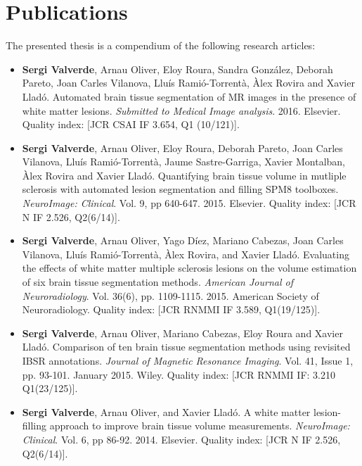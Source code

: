 
\chapter*{Publications}


The presented thesis is a compendium of the following research articles:

\begin{itemize}

\item  \textbf{Sergi Valverde}, Arnau Oliver, Eloy Roura, Sandra Gonz\'{a}lez, Deborah Pareto, Joan Carles Vilanova, Llu\'{i}s Rami\'{o}-Torrent\`{a}, \`{A}lex Rovira and Xavier Llad\'{o}.  Automated brain tissue segmentation of MR images in the presence of white matter lesions. \textit{Submitted to Medical Image analysis}. 2016. Elsevier.  Quality index:  [JCR CSAI IF 3.654, Q1 (10/121)].

\item \textbf{Sergi Valverde}, Arnau Oliver, Eloy Roura, Deborah Pareto, Joan Carles Vilanova, Llu\'{i}s Rami\'{o}-Torrent\`{a}, Jaume Sastre-Garriga, Xavier Montalban, \`{A}lex Rovira and Xavier Llad\'{o}. Quantifying brain tissue volume in mutliple sclerosis with automated lesion segmentation and filling SPM8 toolboxes. \textit{NeuroImage: Clinical}. Vol. 9, pp 640-647. 2015. Elsevier.  Quality index:  [JCR N IF 2.526, Q2(6/14)].

\item  \textbf{Sergi Valverde}, Arnau Oliver, Yago D\'{i}ez, Mariano Cabezas, Joan Carles Vilanova, Llu\'{i}s Rami\'{o}-Torrent\`{a}, \`{A}lex Rovira, and Xavier Llad\'o. Evaluating the effects of white matter multiple sclerosis lesions on the volume estimation of six brain tissue segmentation methods. \textit{American Journal of Neuroradiology}. Vol. 36(6), pp. 1109-1115. 2015. American Society of Neuroradiology.  Quality index: [JCR RNMMI IF 3.589, Q1(19/125)].

\item \textbf{Sergi Valverde}, Arnau Oliver, Mariano Cabezas, Eloy Roura and Xavier Llad\'{o}. Comparison of ten brain tissue segmentation methods using revisited IBSR annotations. \textit{Journal of Magnetic Resonance Imaging}. Vol. 41, Issue 1, pp. 93-101. January 2015. Wiley.  Quality index: [JCR RNMMI IF: 3.210 Q1(23/125)].

\item  \textbf{Sergi Valverde}, Arnau Oliver, and Xavier Llad\'o. A white matter lesion-filling approach to improve brain tissue volume measurements. \textit{NeuroImage: Clinical}. Vol. 6, pp 86-92. 2014. Elsevier. Quality index: [JCR N IF 2.526, Q2(6/14)].

\end{itemize}


